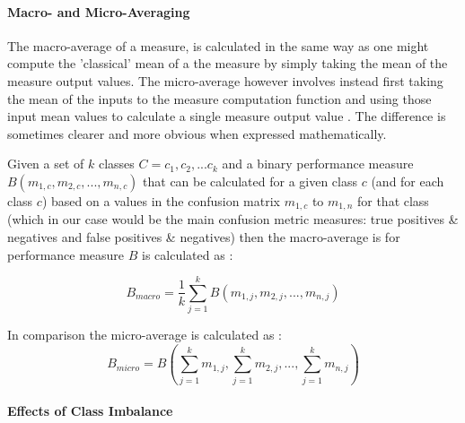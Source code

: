 \documentclass[]{article}
\begin{document}
\paragraph{Macro- and Micro-Averaging}

The macro-average of a measure, is calculated in the same way as one might compute the 'classical' mean of a the measure by simply taking the mean of the measure output values. The micro-average however involves instead first taking the mean of the inputs to the measure computation function and using those input mean values to calculate a single measure output value \cite{VanAsch2013}. The difference is sometimes clearer and more obvious when expressed mathematically.

Given a set of $k$ classes $C = {c_1,c_2,...c_k}$ and a binary performance measure $B(m_{1,c},m_{2,c},...,m_{n,c})$ that can be calculated for a given class $c$ (and for each class $c$) based on a values in the confusion matrix $m_{1,c}$ to $m_{1,n}$ for that class (which in our case would be the main confusion metric measures: true positives \& negatives and false positives \& negatives) then the macro-average is for performance measure $B$ is calculated as \cite{VanAsch2013,Forman2010,Tsoumakas2009}:

\begin{equation}
B_{macro} = \frac{1}{k}\sum\limits_{j=1}^{k}B(m_{1,j},m_{2,j},...,m_{n,j})
\end{equation}

\noindent In comparison the micro-average is calculated as \cite{VanAsch2013,Forman2010,Tsoumakas2009}:
\begin{equation}
B_{micro} = B(\sum\limits_{j=1}^{k}m_{1,j},\sum\limits_{j=1}^{k}m_{2,j},...,\sum\limits_{j=1}^{k}m_{n,j})
\end{equation}

\paragraph{Effects of Class Imbalance}
\end{document}
